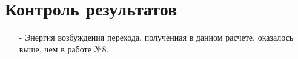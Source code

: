 \section{Контроль результатов}
\begin{itemize}
    \item[-] Энергия возбуждения перехода, полученная в данном расчете, оказалось выше, чем в работе №8.
\end{itemize}{}